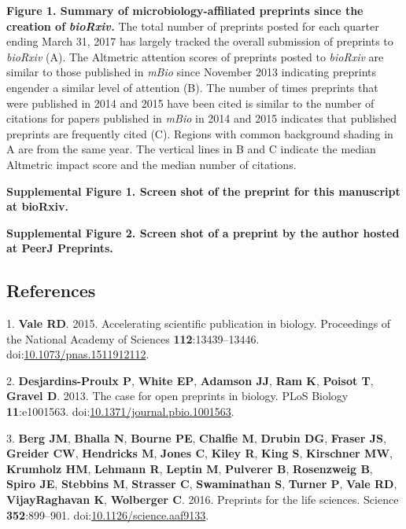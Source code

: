 \documentclass[11,]{article}
\begin{document}
\newpage

\textbf{Figure 1. Summary of microbiology-affiliated preprints since the
creation of} \textbf{\emph{bioRxiv.}} The total number of preprints
posted for each quarter ending March 31, 2017 has largely tracked the
overall submission of preprints to \emph{bioRxiv} (A). The Altmetric
attention scores of preprints posted to \emph{bioRxiv} are similar to
those published in \emph{mBio} since November 2013 indicating preprints
engender a similar level of attention (B). The number of times preprints
that were published in 2014 and 2015 have been cited is similar to the
number of citations for papers published in \emph{mBio} in 2014 and 2015
indicates that published preprints are frequently cited (C). Regions
with common background shading in A are from the same year. The vertical
lines in B and C indicate the median Altmetric impact score and the
median number of citations.

\textbf{Supplemental Figure 1. Screen shot of the preprint for this
manuscript at bioRxiv.}

\textbf{Supplemental Figure 2. Screen shot of a preprint by the author
hosted at PeerJ Preprints.}

\newpage

\subsection{References}\label{references}

1. \textbf{Vale RD}. 2015. Accelerating scientific publication in
biology. Proceedings of the National Academy of Sciences
\textbf{112}:13439--13446.
doi:\href{http://dx.doi.org/10.1073/pnas.1511912112}{10.1073/pnas.1511912112}.

2. \textbf{Desjardins-Proulx P}, \textbf{White EP}, \textbf{Adamson JJ},
\textbf{Ram K}, \textbf{Poisot T}, \textbf{Gravel D}. 2013. The case for
open preprints in biology. PLoS Biology \textbf{11}:e1001563.
doi:\href{http://dx.doi.org/10.1371/journal.pbio.1001563}{10.1371/journal.pbio.1001563}.

3. \textbf{Berg JM}, \textbf{Bhalla N}, \textbf{Bourne PE},
\textbf{Chalfie M}, \textbf{Drubin DG}, \textbf{Fraser JS},
\textbf{Greider CW}, \textbf{Hendricks M}, \textbf{Jones C},
\textbf{Kiley R}, \textbf{King S}, \textbf{Kirschner MW},
\textbf{Krumholz HM}, \textbf{Lehmann R}, \textbf{Leptin M},
\textbf{Pulverer B}, \textbf{Rosenzweig B}, \textbf{Spiro JE},
\textbf{Stebbins M}, \textbf{Strasser C}, \textbf{Swaminathan S},
\textbf{Turner P}, \textbf{Vale RD}, \textbf{VijayRaghavan K},
\textbf{Wolberger C}. 2016. Preprints for the life sciences. Science
\textbf{352}:899--901.
doi:\href{http://dx.doi.org/10.1126/science.aaf9133}{10.1126/science.aaf9133}.
\end{document}
